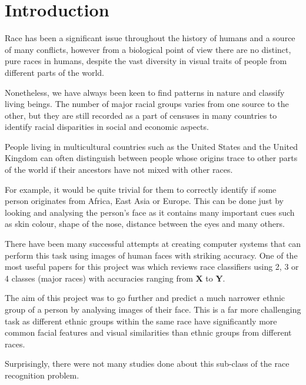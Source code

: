 \chapter{Introduction}
\label{introduction}

Race has been a significant issue throughout the history of humans 
and a source of many conflicts, however from a biological point of view
there are no distinct, pure races in humans, despite the vast diversity 
in visual traits of people from different parts of the world.

Nonetheless, we have always been keen to find patterns in nature and 
classify living beings. The number of major racial groups varies from 
one source to the other, but they are still recorded as a part of censuses 
in many countries to identify racial disparities in social and economic aspects.

People living in multicultural countries such as the United States and the 
United Kingdom can often distinguish between people whose origins trace to other
parts of the world if their ancestors have not mixed with other races.

For example, it would be quite trivial for them to correctly identify if some person
originates from Africa, East Asia or Europe. This can be done just by looking and
analysing the person's face as it contains many important cues such as skin colour, 
shape of the nose, distance between the eyes and many others.

There have been many successful attempts at creating computer systems that can perform
this task using images of human faces with striking accuracy. One of the 
most useful papers for this project was \citep{muhammadg} which reviews 
race classifiers using 2, 3 or 4 classes (major races) with accuracies 
ranging from \textbf{X} to \textbf{Y}.

The aim of this project was to go further and predict a much narrower ethnic group 
of a person by analysing images of their face. This is a far more challenging task 
as different ethnic groups within the same race have significantly more common 
facial features and visual similarities than ethnic groups from different races.

Surprisingly, there were not many studies done about this sub-class of the race 
recognition problem.






